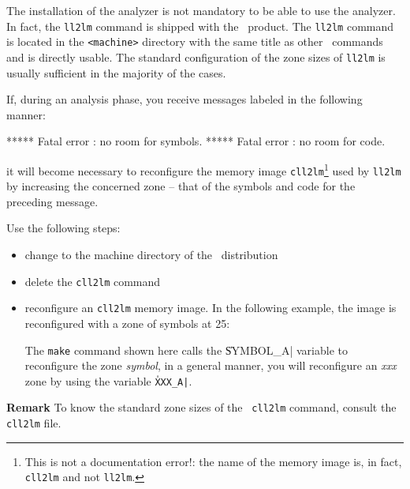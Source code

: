 
The installation of the analyzer is not mandatory to be able to use the analyzer.  In fact, the {\tt ll2lm} command is shipped with the \LeLisp\  product.  The
{\tt ll2lm} command is located in the {\tt <machine>} directory with the same title as other \LeLisp\ commands and is directly usable.  The standard configuration of the zone sizes of {\tt ll2lm} is usually sufficient in the majority of the cases.

If, during an analysis phase, you receive messages labeled in the following manner:

\begin{Code*}
***** Fatal error : no room for symbols.
***** Fatal error : no room for code.
\end{Code*}

it will become necessary to reconfigure the memory image {\tt cll2lm}\footnote{This is not a documentation error!: the name of the memory image is, in fact, {\tt cll2lm} and not {\tt ll2lm}.}
used by {\tt ll2lm} by increasing the concerned zone -- that of the symbols and code for the preceding message.

Use the following steps:

\begin{itemize}
\item change to the machine directory of the \LeLisp\ distribution
\begin{Code*}
\end{Code*}
\item delete the {\tt cll2lm} command
\begin{Code*}
\end{Code*}
\item reconfigure an {\tt cll2lm} memory image.  In the following example, the image is reconfigured with a zone of symbols at 25:  
\begin{Code*}
\end{Code*}
The {\tt make} command shown here calls the \|SYMBOL_A| variable to reconfigure the zone {\em symbol}, in a general manner, you will reconfigure an {\em xxx} zone by using the variable {\tt \|XXX_A|}. 
\end{itemize}

\begin{Side}{\bf Remark} 
To know the standard zone sizes of the {\tt
cll2lm} command, consult the {\tt cll2lm} file.
\begin{Code*}
\end{Code*}
\end{Side}
